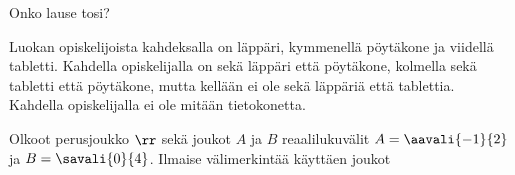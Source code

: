 \begin{kotitehtavasivu}
\begin{tehtava}
Onko lause tosi?
    \begin{alakohdat}
    \end{alakohdat}

    \begin{vastaus}
    
        \begin{alakohdat}
        \end{alakohdat}
    \end{vastaus}
\end{tehtava}


\begin{tehtava}
Luokan opiskelijoista kahdeksalla on läppäri, kymmenellä pöytäkone ja
viidellä tabletti.
Kahdella opiskelijalla on sekä läppäri että pöytäkone, kolmella sekä
tabletti että pöytäkone, mutta kellään ei ole sekä läppäriä että
tablettia. Kahdella opiskelijalla ei ole mitään tietokonetta.
    \begin{alakohdat}
    \end{alakohdat}

    \begin{vastaus}
    
        \begin{alakohdat}
        \alakohta{-} %
        \end{alakohdat}
    \end{vastaus}
\end{tehtava}

\begin{tehtava}
Olkoot perusjoukko $\rr$ sekä joukot $A$ ja $B$ reaalilukuvälit $A=\aavali{-1}{2}$ ja $B=\savali{0}{4}$. Ilmaise välimerkintää käyttäen joukot
    \begin{alakohdat}
    \end{alakohdat}


\end{tehtava}
\end{kotitehtavasivu}
